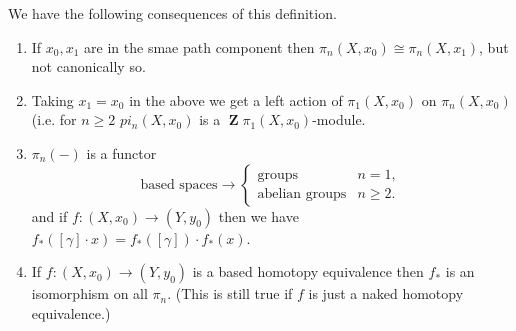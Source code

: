 \documentclass[10pt,]{book}
\theoremstyle{plain}
\theoremstyle{definition}
\DeclareMathOperator{\ZZ}{\mathbf{Z}}
\begin{document}
\par
We have the following consequences of this definition.
          \begin{enumerate}
\item{}If \(x_0,x_1\) are in the smae path component then \(\pi_n(X,x_0) \cong \pi_n(X,x_1)\), but not canonically so.\item{}Taking \(x_1 = x_0\) in the above we get a left action of \(\pi_1(X,x_0)\) on \(\pi_n(X,x_0)\) (i.e. for \(n\ge 2\) \(pi_n(X,x_0)\) is a \(\ZZ \pi_1(X,x_0)\)-module.\item{}\(\pi_n(-)\) is a functor \[\text{based spaces} \to \begin{cases} \text{groups}&n=1,\\\text{abelian groups}& n\ge 2.\end{cases}\] and if \(f\colon (X,x_0) \to (Y,y_0)\) then we have \(f_*([\gamma]\cdot x) = f_*([\gamma])\cdot f_*(x)\).\item{}If \(f\colon (X,x_0)\to (Y,y_0)\) is  a based homotopy equivalence then \(f_*\) is  an isomorphism on all \(\pi_n\). (This is still true if \(f\) is just a naked homotopy equivalence.)\end{enumerate}

\typeout{************************************************}
\typeout{************************************************}
\end{document}
